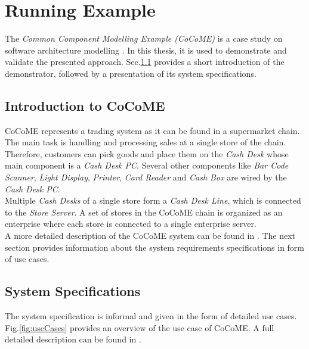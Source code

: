 \chapter{Running Example}
\label{ch:CoCoME}
The \textit{Common Component Modelling Example (CoCoME)} is a case study on software architecture modelling \cite{CoCoMEOld}\cite{CoCoMETechnical}. In this thesis, it is used to demonstrate and validate the presented approach. Sec.\ref{sec:CoCoME:Introduction} provides a short introduction of the demonstrator, followed by a presentation of its system specifications.


\section{Introduction to CoCoME}
\label{sec:CoCoME:Introduction}
CoCoME represents a trading system as it can be found in a supermarket chain. The main task is handling and processing sales at a single store of the chain. Therefore, customers can pick goods and place them on the \textit{Cash Desk} whose main component is a \textit{Cash Desk PC}. Several other components like \textit{Bar Code Scanner}, \textit{Light Display}, \textit{Printer}, \textit{Card Reader} and \textit{Cash Box} are wired by the  \textit{Cash Desk PC}. \\
Multiple  \textit{Cash Desks} of a single store form a  \textit{Cash Desk Line}, which is connected to the  \textit{Store Server}. A set of stores in the CoCoME chain is organized as an enterprise where each store is connected to a single enterprise server. \\
A more detailed description of the CoCoME system can be found in \cite{CoCoMEOld}\cite{CoCoMETechnical}. The next section provides information about the system requirements specifications in form of use cases.
 


\section{System Specifications}
\label{sec:CoCoME:systemSpecifications}
The system specification is informal and given in the form of detailed use cases. Fig.\ref{fig:useCases} provides an overview of the use case of CoCoME. A full detailed description can be found in \cite{CoCoMEOld}.




